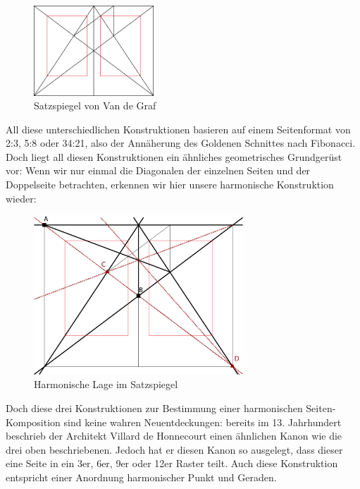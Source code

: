 \documentclass[12pt,a4paper]{article}
\begin{document}
\begin{figure}
\vspace{-0.04\textheight}
\includegraphics[width=0.4\textwidth]{Bilder/Van_de_Graaf_1.png}
\caption{Satzspiegel von Van de Graf\protect\footnotemark[6]}
\label{fig:VDG}
\end{figure}


All diese unterschiedlichen Konstruktionen basieren auf einem Seitenformat von 2:3, 5:8 oder 34:21, also der Annäherung des Goldenen Schnittes nach Fibonacci. Doch liegt all diesen Konstruktionen ein ähnliches geometrisches Grundgerüst vor: Wenn wir nur einmal die Diagonalen der einzelnen Seiten und der Doppelseite betrachten, erkennen wir hier unsere harmonische Konstruktion wieder:

\begin{figure}[htbp]
\centering
\includegraphics[width=0.7\textwidth]{Bilder/Van_de_Graaf.png}
\caption{Harmonische Lage im Satzspiegel}
\label{fig:harmVDG}
\end{figure}

Doch diese drei Konstruktionen zur Bestimmung einer harmonischen Seiten-Komposition sind keine wahren Neuentdeckungen: bereits im 13. Jahrhundert beschrieb der Architekt Villard de Honnecourt einen ähnlichen Kanon wie die drei oben beschriebenen. Jedoch hat er diesen Kanon so ausgelegt, dass dieser eine Seite in ein 3er, 6er, 9er oder 12er Raster teilt. Auch diese Konstruktion entspricht einer Anordnung harmonischer Punkt und Geraden. %
\end{document}
